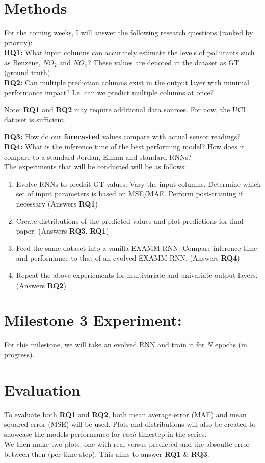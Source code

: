 \documentclass[12pt]{article}
\begin{document}
\section{Methods}
For the coming weeks, I will answer the following research questions (ranked by priority):\\
\textbf{RQ1:} What input columns can accurately estimate the levels of pollutants such as Benzene, $NO_2$ and $NO_x$? These values are denoted in the dataset as GT (ground truth).\\
\textbf{RQ2:} Can multiple prediction columns exist in the output layer with minimal performance impact? I.e. can we predict multiple columns at once? \\
\begin{footnotesize}
    Note: \textbf{RQ1} and \textbf{RQ2} may require additional data sources. For now, the UCI dataset is sufficient.\\
\end{footnotesize}
\textbf{RQ3:} How do our \textbf{forecasted} values compare with actual sensor readings?\\
\textbf{RQ4:} What is the inference time of the best performing model? How does it compare to a standard Jordan, Elman and standard RNNs? \\
The experiments that will be conducted will be as follows:
\begin{enumerate}
    \item
        Evolve RNNs to predcit GT values. Vary the input columns. Determine which set of input parameters is  based on MSE/MAE. Perform post-training if necessary (Answers \textbf{RQ1})
    \item
        Create distributions of the predicted values and plot predictions for final paper. (Answers \textbf{RQ3}, \textbf{RQ1})
    \item
        Feed the same dataset into a vanilla EXAMM RNN. Compare inference time and performance to that of an evolved EXAMM RNN. (Answers \textbf{RQ4})
    \item
        Repeat the above experiements for multivariate and univariate output layers. (Answers \textbf{RQ2})
\end{enumerate}

\section{Milestone 3 Experiment:}
For this milestone, we will take an evolved RNN and train it for $N$ epochs (in progress). 

\section{Evaluation}
To evaluate both \textbf{RQ1} and \textbf{RQ2}, both mean average error (MAE) and mean squared error (MSE) will be used. Plots and distributions will also be created to showcase the models performance for \textit{each} timestep in the series.\\
We then make two plots, one with real versus predicted and the absoulte error between then (per time-step).
This aims to answer \textbf{RQ1} \& \textbf{RQ3}.

\end{document}
